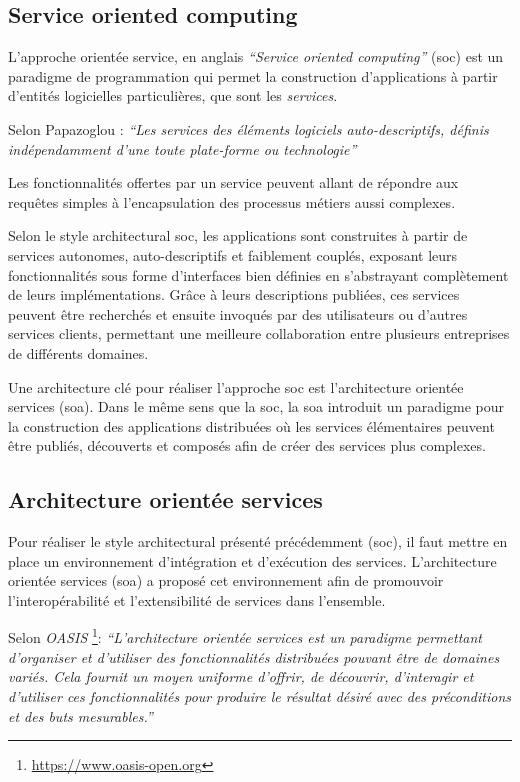   \subsection{Service oriented computing}
  \label{sec:soc}
  L'approche orientée service, en anglais \textit{``Service oriented
    computing''} (\acrshort{soc}) est un paradigme de programmation
  qui permet la construction d'applications à partir d'entités
  logicielles particulières, que sont les \emph{services}.\bigskip

  Selon Papazoglou \cite{papazoglou2003service}: \textit{``Les
    services des éléments logiciels auto-descriptifs, définis
    indépendamment d'une toute plate-forme ou technologie''}\bigskip

  Les fonctionnalités offertes par un service peuvent allant de
  répondre aux requêtes simples à l'encapsulation des processus
  métiers aussi complexes.\medskip

  Selon le style architectural \acrshort{soc}, les applications sont
  construites à partir de services autonomes, auto-descriptifs et
  faiblement couplés, exposant leurs fonctionnalités sous forme
  d'interfaces bien définies en s'abstrayant complètement de leurs
  implémentations. Grâce à leurs descriptions publiées, ces services
  peuvent être recherchés et ensuite invoqués par des utilisateurs ou
  d'autres services clients, permettant une meilleure collaboration
  entre plusieurs entreprises de différents domaines.\medskip

  Une architecture clé pour réaliser l'approche \acrshort{soc} est
  l'architecture orientée services (\acrshort{soa}). Dans le même
  sens que la \acrshort{soc}, la \acrshort{soa} introduit un paradigme
  pour la construction des applications distribuées où les services
  élémentaires peuvent être publiés, découverts et composés afin de
  créer des services plus complexes.

  \subsection{Architecture orientée services}
  \label{sec:soa}
  Pour réaliser le style architectural présenté précédemment
  (\acrshort{soc}), il faut mettre en place un environnement
  d'intégration et d'exécution des services. L'architecture orientée
  services (\acrshort{soa}) a proposé cet environnement afin de
  promouvoir l'interopérabilité et l'extensibilité de services dans
  l'ensemble.\bigskip

  Selon \textit{OASIS} \footnote{\url{https://www.oasis-open.org}}:
  \textit{``L'architecture orientée services est un paradigme
    permettant d'organiser et d'utiliser des fonctionnalités
    distribuées pouvant être de domaines variés. Cela fournit un moyen
    uniforme d'offrir, de découvrir, d'interagir et d'utiliser ces
    fonctionnalités pour produire le résultat désiré avec des
    préconditions et des buts mesurables.''}\bigskip

